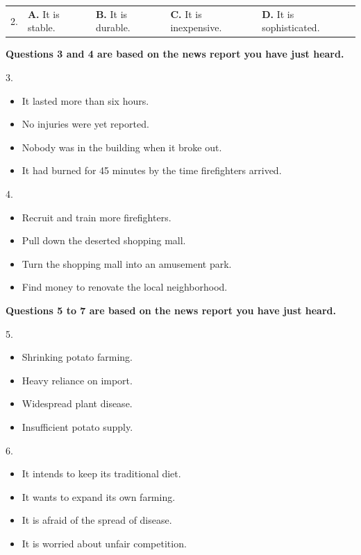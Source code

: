\documentclass[UTF8,11pt]{ctexart}
\begin{document}
\noindent\begin{tabularx}{\linewidth}{@{}lXXXX@{}}2. & \textbf{A.} It is stable. & \textbf{B.} It is durable. & \textbf{C.} It is inexpensive. & \textbf{D.} It is sophisticated.\\\end{tabularx}\par

\textbf{Questions 3 and 4 are based on the news report you have just heard.}


3.


\begin{itemize}[leftmargin=2em,itemsep=.2em,topsep=.4em]\item[A.] It lasted more than six hours.
\item[B.] No injuries were yet reported.
\item[C.] Nobody was in the building when it broke out.
\item[D.] It had burned for 45 minutes by the time firefighters arrived.
\end{itemize}

4.


\begin{itemize}[leftmargin=2em,itemsep=.2em,topsep=.4em]\item[A.] Recruit and train more firefighters.
\item[B.] Pull down the deserted shopping mall.
\item[C.] Turn the shopping mall into an amusement park.
\item[D.] Find money to renovate the local neighborhood.
\end{itemize}

\textbf{Questions 5 to 7 are based on the news report you have just heard.}


5.


\begin{itemize}[leftmargin=2em,itemsep=.2em,topsep=.4em]\item[A.] Shrinking potato farming.
\item[B.] Heavy reliance on import.
\item[C.] Widespread plant disease.
\item[D.] Insufficient potato supply.
\end{itemize}

6.


\begin{itemize}[leftmargin=2em,itemsep=.2em,topsep=.4em]\item[A.] It intends to keep its traditional diet.
\item[B.] It wants to expand its own farming.
\item[C.] It is afraid of the spread of disease.
\item[D.] It is worried about unfair competition.
\end{itemize}
\end{document}
